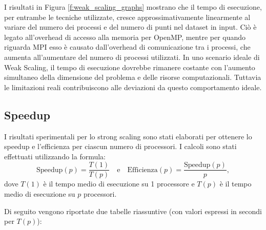 \documentclass[letterpaper,11pt,leqno]{article}
\begin{document}
I risultati in Figura \ref{f:weak_scaling_graphs} mostrano che il tempo di esecuzione, per entrambe le tecniche utilizzate, cresce approssimativamente linearmente al variare del numero dei processi e del numero di punti nel dataset in input. Ciò è legato all'overhead di accesso alla memoria per OpenMP, mentre per quando riguarda MPI esso è causato dall'overhead di comunicazione tra i processi, che aumenta all'aumentare del numero di processi utilizzati.
In uno scenario ideale di Weak Scaling, il tempo di esecuzione dovrebbe rimanere costante con l'aumento simultaneo della dimensione del problema e delle risorse computazionali. Tuttavia le limitazioni reali contribuiscono alle deviazioni da questo comportamento ideale.


\subsection{Speedup}

I risultati sperimentali per lo strong scaling sono stati elaborati per ottenere lo speedup e l'efficienza per ciascun numero di processori. I calcoli sono stati effettuati utilizzando la formula:
\[
\text{Speedup}(p) = \frac{T(1)}{T(p)} \quad\text{e}\quad \text{Efficienza}(p) = \frac{\text{Speedup}(p)}{p},
\]
dove \(T(1)\) è il tempo medio di esecuzione su 1 processore e \(T(p)\) è il tempo medio di esecuzione su \(p\) processori.

Di seguito vengono riportate due tabelle riassuntive (con valori espressi in secondi per \(T(p)\)):
\end{document}
